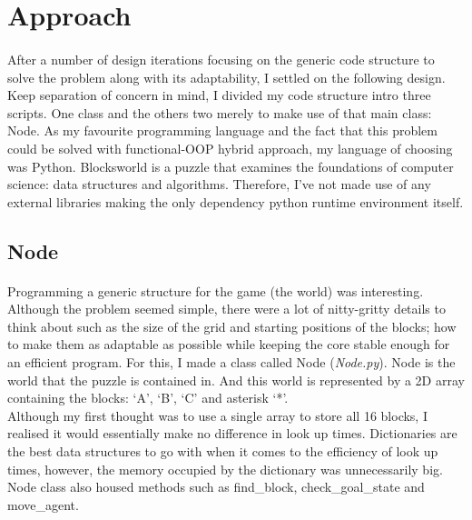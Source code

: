 \documentclass[10pt]{article}
\begin{document}
\newpage																		

\tableofcontents 

\newpage

  \section{Approach}
  \paragraph{} \indent
  After a number of design iterations focusing on the generic code structure to solve the problem along with its adaptability, I settled on the following design. Keep separation of concern in mind, I divided my code structure intro three scripts. One class and the others two merely to make use of that main class: Node. As my favourite programming language and the fact that this problem could be solved with functional-OOP hybrid approach, my language of choosing was Python. Blocksworld is a puzzle that examines the foundations of computer science: data structures and algorithms. Therefore, I’ve not made use of any external libraries making the only dependency python runtime environment itself.

  \subsection{Node}
  \paragraph{} \indent
  Programming a generic structure for the game (the world) was interesting. Although the problem seemed simple, there were a lot of nitty-gritty details to think about such as the size of the grid and starting positions of the blocks; how to make them as adaptable as possible while keeping the core stable enough for an efficient program. For this, I made a class called Node (\textit{Node.py}). Node is the world that the puzzle is contained in. And this world is represented by a 2D array containing the blocks: `A', `B', `C' and asterisk `*'. \\
  
  Although my first thought was to use a single array to store all 16 blocks, I realised it would essentially make no difference in look up times. Dictionaries are the best data structures to go with when it comes to the efficiency of look up times, however, the memory occupied by the dictionary was unnecessarily big. Node class also housed methods such as find\_block, check\_goal\_state and move\_agent.\\
\end{document}
